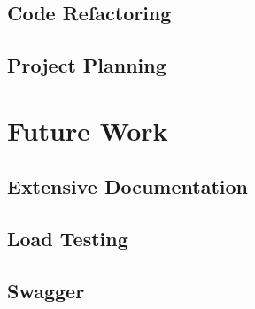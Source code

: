 \documentclass{article}
\begin{document}




        \subsection{Code Refactoring}
        \subsection{Project Planning}
        
        
    \section{Future Work}
        \subsection{Extensive Documentation}
        \subsection{Load Testing}
        \subsection{Swagger}


\end{document}

